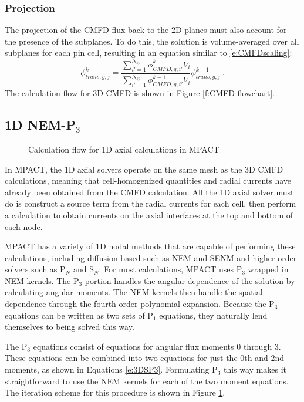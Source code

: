 \subsubsection{Projection}\label{sss:cmfdProj}

The projection of the CMFD flux back to the 2D planes must also account for the presence of the subplanes.  To do this, the solution is volume-averaged over all subplanes for each pin cell, resulting in an equation similar to \ref{e:CMFDscaling}:
\begin{equation}
\phi_{trans,g,j}^k = \frac{\sum_{i'=1}^{N_{sp}} \phi_{CMFD,g,i'}^k V_i}{\sum_{i'=1}^{N_{sp}} \phi_{CMFD,g,i'}^{k-1} V_i} \phi_{trans,g,j}^{k-1}\ .
\end{equation}
The calculation flow for 3D CMFD is shown in Figure \ref{f:CMFD-flowchart}.

\subsection{1D NEM-P\texorpdfstring{$_3$}{3}}

\begin{figure}[H]
  \centering
  
  \caption{Calculation flow for 1D axial calculations in MPACT}\label{f:Axial-flowchart}
\end{figure}

In MPACT, the 1D axial solvers operate on the same mesh as the 3D CMFD calculations, meaning that cell-homogenized quantities and radial currents have already been obtained from the CMFD calculation.  All the 1D axial solver must do is construct a source term from the radial currents for each cell, then perform a calculation to obtain currents on the axial interfaces at the top and bottom of each node.

MPACT has a variety of 1D nodal methods that are capable of performing these calculations, including diffusion-based such as NEM and SENM and higher-order solvers such as P$_N$ and S$_N$.  For most calculations, MPACT uses P$_3$ wrapped in NEM kernels.  The P$_3$ portion handles the angular dependence of the solution by calculating angular moments.  The NEM kernels then handle the spatial dependence through the fourth-order polynomial expansion.  Because the P$_3$ equations can be written as two sets of P$_1$ equations, they naturally lend themselves to being solved this way.

The P$_3$ equations consist of equations for angular flux moments 0 through 3.  These equations can be combined into two equations for just the 0th and 2nd moments, as shown in Equations \ref{e:3DSP3}.  Formulating P$_3$ this way makes it straightforward to use the NEM kernels for each of the two moment equations.  The iteration scheme for this procedure is shown in Figure \ref{f:Axial-flowchart}.

